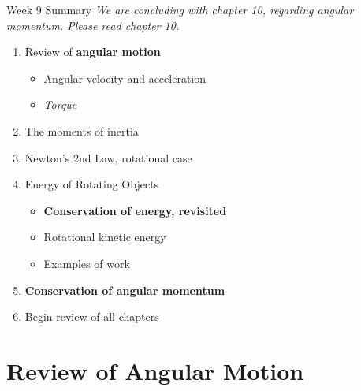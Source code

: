 \documentclass{beamer}
\begin{document}
\begin{frame}{Week 9 Summary}
\textit{We are concluding with chapter 10, regarding angular momentum. Please read chapter 10.}
\begin{enumerate}
\item Review of \textbf{angular motion}
\begin{itemize}
\item Angular velocity and acceleration
\item \textit{Torque}
\end{itemize}
\item \alert{The moments of inertia}
\item Newton's 2nd Law, rotational case
\item Energy of Rotating Objects
\begin{itemize}
\item \textbf{Conservation of energy, revisited}
\item Rotational kinetic energy
\item Examples of work
\end{itemize}
\item \textbf{\alert{Conservation of angular momentum}}
\item Begin review of all chapters
\end{enumerate}
\end{frame}

\section{Review of Angular Motion}
\end{document}
